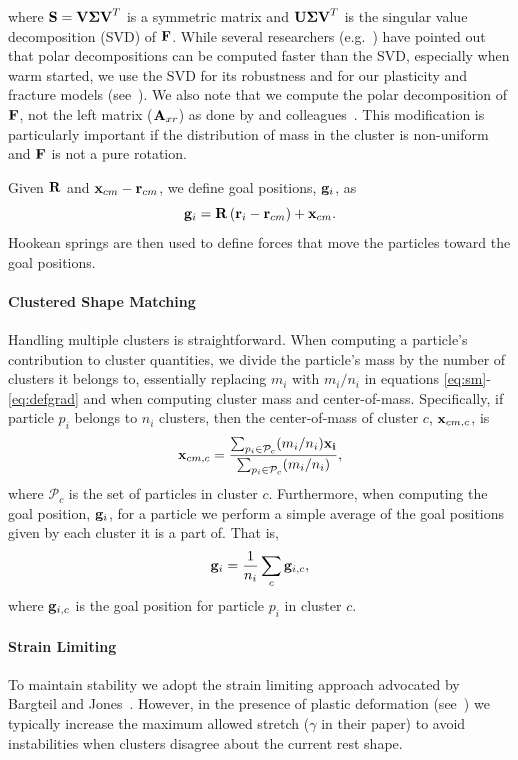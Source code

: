 \documentclass[review]{acmsiggraph}
\begin{document}
where $\mathit{\mathbf{S}}=\mathit{\mathbf{V\Sigma V}}^T$ is a symmetric matrix and $\mathit{\mathbf{U\Sigma V}}^T$ is the singular value decomposition (SVD) of $\mathit{\mathbf{F}}$.
While several researchers (e.g.~\cite{Rivers:2007:FFL}) have pointed out that polar decompositions can be computed faster than the SVD,
especially when warm started, we use the SVD for its robustness and for our plasticity and fracture models 
(see~).  
We also note that we compute the polar decomposition of $\mathit{\mathbf{F}}$, not
the left matrix ($\mathit{\mathbf{A}}_{xr}$)
as done by \Mueller and colleagues~.  This modification
is particularly important if the distribution of mass in the cluster is non-uniform and $\mathit{\mathbf{F}}$ is not a pure rotation.

Given $\mathit{\mathbf{R}}$ and $\mathit{\mathbf{x}}_{cm}-\mathit{\mathbf{r}}_{cm}$, we define goal positions, $\mathit{\mathbf{g}}_i$, as
\begin{equation}
\mathit{\mathbf{g}}_i = \mathit{\mathbf{R}}\left(\mathit{\mathbf{r}}_i-\mathit{\mathbf{r}}_{cm}\right)+\mathit{\mathbf{x}}_{cm}.
\end{equation}
Hookean springs are then used to define forces that move the particles toward the goal positions.

\paragraph{Clustered Shape Matching}
Handling multiple clusters is straightforward.  When computing a particle's contribution to 
cluster quantities, we divide the particle's mass by the number of clusters it belongs to,
essentially replacing $m_i$ with $m_i/n_i$ in equations \eqref{eq:sm}-\eqref{eq:defgrad} 
and when computing cluster mass and center-of-mass.
Specifically, if particle $p_i$ belongs
to $n_i$ clusters, then the center-of-mass of cluster $c$, $\mathit{\mathbf{x}}_{cm,c}$, is
\begin{equation}
\mathit{\mathbf{x}}_{cm,c} = \frac{\sum_{p_i\in\mathcal{P}_c}(m_i/n_i)\mathit{\mathbf{x_i}}}{\sum_{p_i\in\mathcal{P}_c}(m_i/n_i)},
\end{equation}
where $\mathcal{P}_c$ is the set of particles in cluster $c$.
Furthermore, when computing the goal position, $\mathit{\mathbf{g}}_i$, for a particle we perform a simple
average of the goal positions given by each cluster it is a part of.  That is,
\begin{equation}
\mathit{\mathbf{g}}_i = \frac{1}{n_i} \sum_c \mathit{\mathbf{g}}_{i,c},
\end{equation}
where $\mathit{\mathbf{g}}_{i,c}$ is the goal position for particle $p_i$ in cluster $c$.

\paragraph{Strain Limiting}
To maintain stability we adopt the strain limiting approach advocated by Bargteil and Jones~.
However, in the presence of plastic deformation (see~) we typically increase the maximum allowed stretch ($\gamma$ in
their paper) to avoid instabilities when clusters disagree about the current rest shape.
\end{document}
